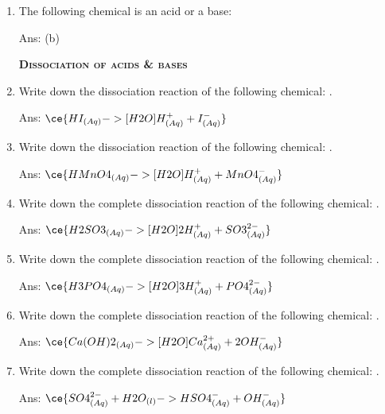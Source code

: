 \documentclass[main.tex]{subfiles}
\begin{document}
\begin{multicols*}{2}
\begin{enumerate}
\item The following chemical is an acid or a base: 
\begin{enumerate}[label=(\alph*)]
\begin{flushright}\small Ans: (b)\end{flushright}
\end{enumerate}

{\raggedright\textsc{\textbf{Dissociation of acids \& bases}}\par}

\item Write down the dissociation reaction of the following chemical: .
\begin{flushright}\small Ans: $\ce{HI_{(Aq)} ->[H2O] H^+_{(Aq)} + I^-_{(Aq)}}$ \end{flushright}


\item Write down the dissociation reaction of the following chemical: .
\begin{flushright}\small Ans: $\ce{HMnO4_{(Aq)} ->[H2O] H^+_{(Aq)} + MnO4^-_{(Aq)}}$ \end{flushright}

\item Write down the complete dissociation reaction of the following chemical: .
\begin{flushright}\small Ans: $\ce{H2SO3_{(Aq)} ->[H2O] 2H^+_{(Aq)} + SO3^{2-}_{(Aq)}}$ \end{flushright}

\item Write down the complete dissociation reaction of the following chemical: .
\begin{flushright}\small Ans: $\ce{H3PO4_{(Aq)} ->[H2O] 3H^+_{(Aq)} + PO4^{2-}_{(Aq)}}$ \end{flushright}

\item Write down the complete dissociation reaction of the following chemical: .
\begin{flushright}\small Ans: $\ce{Ca(OH)2_{(Aq)} ->[H2O] Ca^{2+}_{(Aq)} + 2OH^{-}_{(Aq)}}$ \end{flushright}

\item Write down the complete dissociation reaction of the following chemical: .
\begin{flushright}\small Ans: $\ce{SO4^{2-}_{(Aq)} + H2O_{(l)} -> HSO4^{-}_{(Aq)} + OH^{-}_{(Aq)}}$ \end{flushright}


\end{enumerate}
\end{multicols*}
\end{document}
